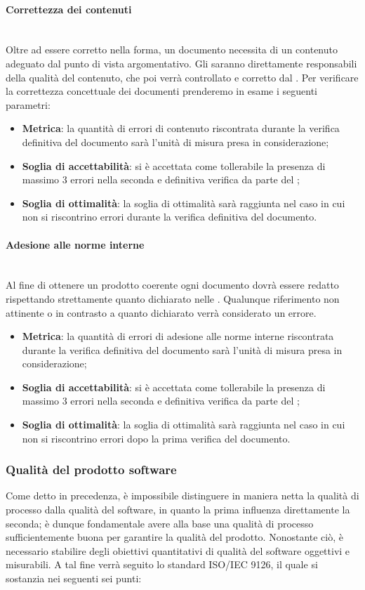 \paragraph{Correttezza dei contenuti}
~\\Oltre ad essere corretto nella forma, un documento necessita di un contenuto adeguato dal punto di vista argomentativo. Gli \anas{} saranno direttamente responsabili della qualità del contenuto, che poi verrà controllato e corretto dal \ver{}.
Per verificare la correttezza concettuale dei documenti prenderemo in esame i seguenti parametri:
\begin{itemize}
	\item \textbf{Metrica}: la quantità di errori di contenuto riscontrata durante la verifica definitiva del documento sarà l'unità di misura presa in considerazione;
	\item \textbf{Soglia di accettabilità}: si è accettata come tollerabile la presenza di massimo 3 errori nella seconda e definitiva verifica da parte del \ver{};
	\item \textbf{Soglia di ottimalità}: la soglia di ottimalità sarà raggiunta nel caso in cui non si riscontrino errori durante la verifica definitiva del documento.
\end{itemize}

\paragraph{Adesione alle norme interne}
~\\Al fine di ottenere un prodotto coerente ogni documento dovrà essere redatto rispettando strettamente quanto dichiarato nelle \NdP{}.
Qualunque riferimento non attinente o in contrasto a quanto dichiarato verrà considerato un errore.
\begin{itemize}
	\item \textbf{Metrica}: la quantità di errori di adesione alle norme interne riscontrata durante la verifica definitiva del documento sarà l'unità di misura presa in considerazione;
	\item \textbf{Soglia di accettabilità}: si è accettata come tollerabile la presenza di massimo 3 errori nella seconda e definitiva verifica da parte del \ver{};
	\item \textbf{Soglia di ottimalità}: la soglia di ottimalità sarà raggiunta nel caso in cui non si riscontrino errori dopo la prima verifica del documento.
\end{itemize}


\subsubsection{Qualità del prodotto software}
Come detto in precedenza, è impossibile distinguere in maniera netta la qualità di processo dalla qualità del software, in quanto la prima influenza direttamente la seconda; è dunque fondamentale avere alla base una qualità di processo sufficientemente buona per garantire la qualità del prodotto. Nonostante ciò, è necessario stabilire degli obiettivi quantitativi di qualità del software oggettivi e misurabili. A tal fine verrà seguito lo standard ISO/IEC 9126, il quale si sostanzia nei seguenti sei punti:

